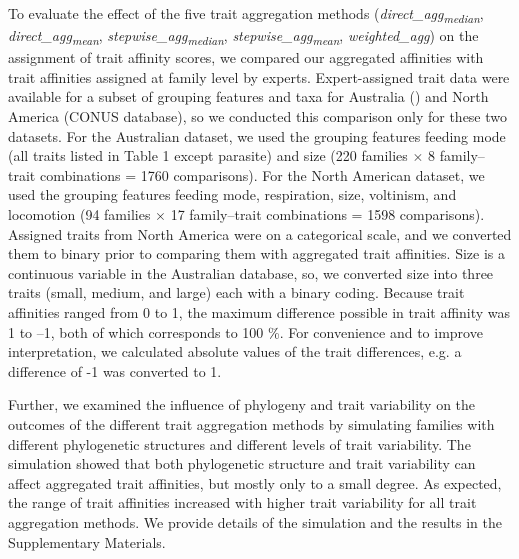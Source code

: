 \documentclass[12pt]{article}
\begin{document}
To evaluate the effect of the five trait aggregation methods
(\textit{direct\_agg\textsubscript{median}}, \textit{direct\_agg\textsubscript{mean}}, \textit{stepwise\_agg\textsubscript{median}}, \textit{stepwise\_agg\textsubscript{mean}}, \textit{weighted\_agg}) on the assignment of trait affinity scores, we compared our aggregated affinities with trait affinities assigned at family level by experts. Expert-assigned trait data were available for a subset of grouping features and taxa for Australia (\cite{chessman_dissolved-oxygen_2018}) and North America (CONUS database), so we conducted this comparison only for these two datasets. For the Australian dataset, we used the grouping features feeding mode (all traits listed in Table 1 except parasite) and size (220 families $\times$ 8 family–trait combinations = 1760 comparisons). For the North American dataset, we used the grouping features feeding mode, respiration, size, voltinism, and locomotion (94 families $\times$ 17 family–trait combinations = 1598 comparisons). Assigned traits from North America were on a categorical scale, and we converted them to binary prior to comparing them with aggregated trait affinities. Size is a continuous variable in the Australian database, so, we converted size into three traits (small, medium, and large) each with a binary coding. Because trait affinities ranged from 0 to 1, the maximum difference possible in trait affinity was 1 to –1, both of which corresponds to 100 \%. For convenience and to improve interpretation, we calculated absolute values of the trait differences, e.g. a difference of -1 was converted to 1.

Further, we examined the influence of phylogeny and trait variability on the outcomes of the different trait aggregation methods by simulating families with different phylogenetic structures and different levels of trait variability. The simulation showed that both phylogenetic structure and trait variability can affect aggregated trait affinities, but mostly only to a small degree. As expected, the range of trait affinities increased with higher trait variability for all trait aggregation methods. We provide details of the simulation and the results in the Supplementary Materials.


\begin{figure}
  \centering
  
\end{figure}
\newpage
\begin{center}
\label{fig:data_proc_overview}
\end{center}
\end{document}
